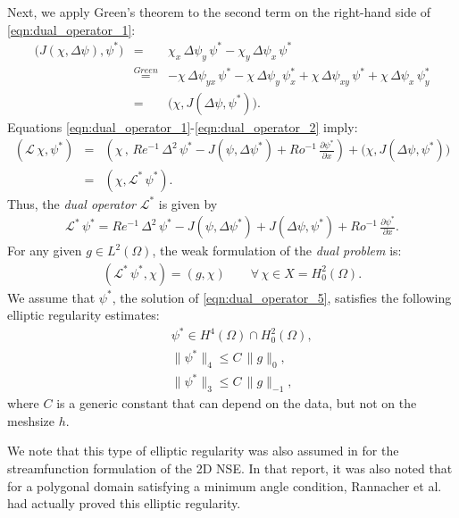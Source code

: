 Next, we apply Green's theorem to the second term on the right-hand side of \eqref{eqn:dual_operator_1}:
\begin{eqnarray}
\biggl( J(\chi , \Delta \psi) , \psi^* \biggr)
&=& \chi_x \, \Delta \psi_y \, \psi^*
   -    \chi_y \, \Delta \psi_x \, \psi^*
\nonumber \\
&\stackrel{Green}{=}& 
- \chi \, \Delta \psi_{y x} \, \psi^* 
- \chi \, \Delta \psi_y \, \psi^*_x
+ \chi \, \Delta \psi_{x y} \, \psi^* 
+ \chi \, \Delta \psi_x \, \psi^*_y
\nonumber \\
&=& \biggl( \chi , J(\Delta \psi , \psi^*) \biggr) .
\label{eqn:dual_operator_2}
\end{eqnarray}
Equations \eqref{eqn:dual_operator_1}-\eqref{eqn:dual_operator_2} imply:
\begin{eqnarray}
(\mathcal{L} \, \chi , \psi^*)
&=& \left( 
\chi \, , \, 
Re^{-1} \, \Delta^2 \, \psi^*
- J(\psi , \Delta \psi^* )
+ Ro^{-1} \, \frac{\partial \psi^*}{\partial x} 
\right)
+ \biggl( \chi , J(\Delta \psi , \psi^*) \biggr)
\nonumber \\
&=& ( \chi , \mathcal{L}^* \, \psi^*) .
\label{eqn:dual_operator_3}
\end{eqnarray}
Thus, the \emph{dual operator} $\mathcal{L}^*$ is given by
\begin{eqnarray}
\mathcal{L}^* \, \psi^*
= Re^{-1} \, \Delta^2 \, \psi^*
- J(\psi , \Delta \psi^* )
+ J(\Delta \psi , \psi^* )
+ Ro^{-1} \, \frac{\partial \psi^*}{\partial x} .
\label{eqn:dual_operator_4}
\end{eqnarray}
For any given $g \in L^2(\Omega)$, the weak formulation of the \emph{dual problem} is:
\begin{eqnarray}
( \mathcal{L}^* \, \psi^* , \chi )
= (g , \chi)
\qquad
\forall \, \chi \in X = H_0^2(\Omega) .
\label{eqn:dual_operator_5}
\end{eqnarray}
We assume that $\psi^*$, the solution of \eqref{eqn:dual_operator_5}, satisfies the following elliptic regularity estimates:
\begin{eqnarray}
&& \psi^* \in H^4(\Omega) \cap H^2_0(\Omega), 
\label{eqn:dual_operator_6a} \\[0.2cm]
&& \| \psi^* \|_4 
\le C \, \|g\|_{0},
\label{eqn:dual_operator_6b} \\[0.2cm]
&& \| \psi^* \|_3 
\le C \, \|g\|_{-1},
\label{eqn:dual_operator_6c}
\end{eqnarray}
where $C$ is a generic constant that can depend on the data, but not on the meshsize $h$.
\begin{remark}
We note that this type of elliptic regularity was also assumed in \cite{Cayco86} for the streamfunction formulation of the 2D NSE.
In that report, it was also noted that for a polygonal domain satisfying a minimum angle condition, Rannacher et al. \cite{} had actually proved this elliptic regularity.
\end{remark}

